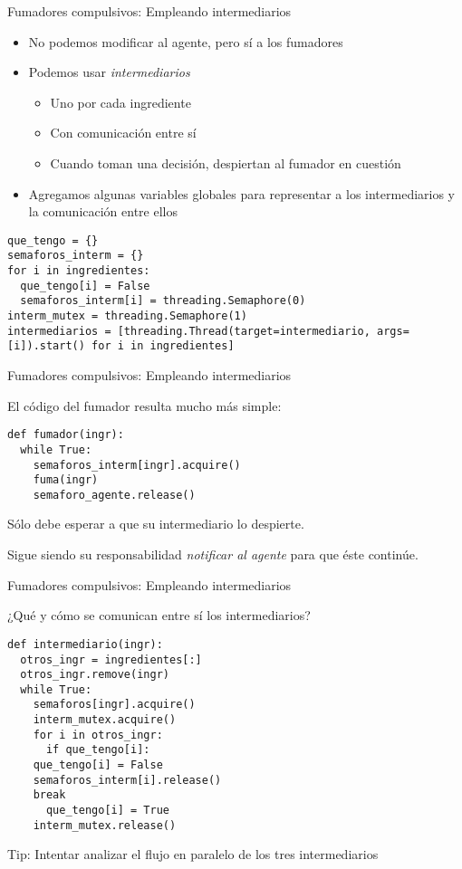\documentclass[presentation]{beamer}
\begin{document}
\begin{frame}[label={sec:orga268d33},fragile]{Fumadores compulsivos: Empleando intermediarios}
 \begin{itemize}
\item No podemos modificar al agente, pero sí a los fumadores
\item Podemos usar \emph{intermediarios}
\begin{itemize}
\item Uno por cada ingrediente
\item Con comunicación entre sí
\item Cuando toman una decisión, despiertan al fumador en cuestión
\end{itemize}
\item Agregamos algunas variables globales para representar a los
intermediarios y la comunicación entre ellos
\end{itemize}
\begin{verbatim}
que_tengo = {}
semaforos_interm = {}
for i in ingredientes:
  que_tengo[i] = False
  semaforos_interm[i] = threading.Semaphore(0)
interm_mutex = threading.Semaphore(1)
intermediarios = [threading.Thread(target=intermediario, args=[i]).start() for i in ingredientes]
\end{verbatim}
\end{frame}

\begin{frame}[label={sec:orgff3cc7a},fragile]{Fumadores compulsivos: Empleando intermediarios}
 \begin{center}
El código del fumador resulta mucho más simple:
\end{center}
\begin{verbatim}
def fumador(ingr):
  while True:
    semaforos_interm[ingr].acquire()
    fuma(ingr)
    semaforo_agente.release()
\end{verbatim}
\begin{center}
Sólo debe esperar a que su intermediario lo despierte.

Sigue siendo su responsabilidad \emph{notificar al agente} para que éste
continúe.
\end{center}
\end{frame}

\begin{frame}[label={sec:org5b68d2b},fragile]{Fumadores compulsivos: Empleando intermediarios}
 \begin{center}
¿Qué y cómo se comunican entre sí los intermediarios?
\end{center}
\begin{verbatim}
def intermediario(ingr):
  otros_ingr = ingredientes[:]
  otros_ingr.remove(ingr)
  while True:
    semaforos[ingr].acquire()
    interm_mutex.acquire()
    for i in otros_ingr:
      if que_tengo[i]:
	que_tengo[i] = False
	semaforos_interm[i].release()
	break
      que_tengo[i] = True
    interm_mutex.release()
\end{verbatim}
\begin{center}
Tip: Intentar analizar el flujo en paralelo de los tres intermediarios
\end{center}
\end{frame}
\end{document}
